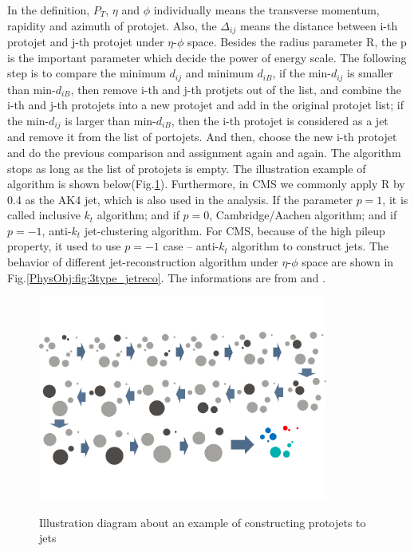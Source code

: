 		In the definition, $P_{T}$, $\eta$ and $\phi$ individually means the transverse momentum, rapidity and azimuth of protojet. Also, the $\Delta_{ij}$ means the distance between i-th protojet and j-th protojet under $\eta$-$\phi$ space. Besides the radius parameter R, the p is the important parameter which decide the power of energy scale. The following step is to compare the minimum $d_{ij}$ and minimum $d_{iB}$, if the min-$d_{ij}$ is smaller than min-$d_{iB}$, then remove i-th and j-th protjets out of the list, and combine the i-th and j-th protojets into a new protojet and add in the original protojet list; if the min-$d_{ij}$ is larger than min-$d_{iB}$, then the i-th protojet is considered as a jet and remove it from the list of portojets. And then, choose the new i-th protojet and do the previous comparison and assignment again and again. The algorithm stops as long as the list of protojets is empty. The illustration example of algorithm is shown below(Fig.\ref{PhysObj:fig:jet_algo}). Furthermore, in CMS we commonly apply R by 0.4 as the AK4 jet, which is also used in the analysis. If the parameter $p=1$, it is called inclusive $k_{t}$ algorithm; and if $p=0$, Cambridge/Aachen algorithm; and if $p=-1$, anti-$k_{t}$ jet-clustering algorithm. For CMS, because of the high pileup property, it used to use $p=-1$ case -- anti-$k_{t}$ algorithm to construct jets. The behavior of different jet-reconstruction algorithm under $\eta$-$\phi$ space are shown in Fig.\ref{PhysObj:fig:3type_jetreco}. The informations are from \cite{Atkin_2015} and \cite{Cacciari_2008}.

		\begin{figure}[H]
		\centering{}
	    	\includegraphics[width=0.85\textwidth]{Figures/PhysObj/jet_algo.pdf}\\
		\caption{Illustration diagram about an example of constructing protojets to jets}
		\label{PhysObj:fig:jet_algo}
		\end{figure}
		\FloatBarrier

